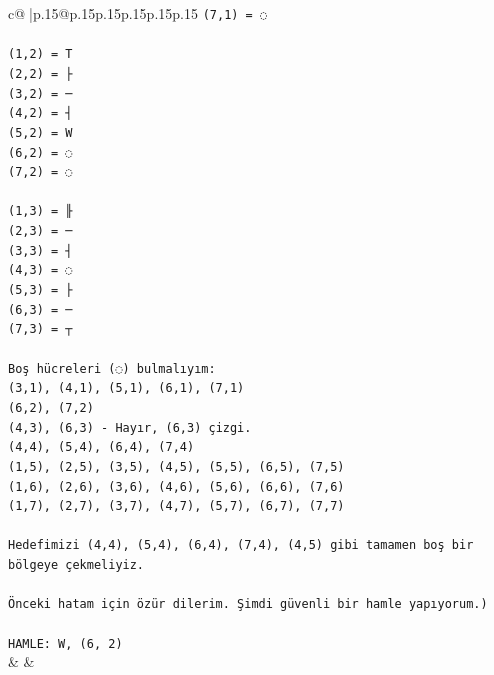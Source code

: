 \documentclass{article}
\begin{document}
{\begin{supertabular}{c@{$\;$}|p{.15\linewidth}@{}p{.15\linewidth}p{.15\linewidth}p{.15\linewidth}p{.15\linewidth}p{.15\linewidth}}
{{{\texttt{(7,1) = ◌} \\
\\ 
\texttt{(1,2) = T} \\
\texttt{(2,2) = ├} \\
\texttt{(3,2) = ─} \\
\texttt{(4,2) = ┤} \\
\texttt{(5,2) = W} \\
\texttt{(6,2) = ◌} \\
\texttt{(7,2) = ◌} \\
\\ 
\texttt{(1,3) = ╟} \\
\texttt{(2,3) = ─} \\
\texttt{(3,3) = ┤} \\
\texttt{(4,3) = ◌} \\
\texttt{(5,3) = ├} \\
\texttt{(6,3) = ─} \\
\texttt{(7,3) = ┬} \\
\\ 
\texttt{Boş hücreleri (◌) bulmalıyım:} \\
\texttt{(3,1), (4,1), (5,1), (6,1), (7,1)} \\
\texttt{(6,2), (7,2)} \\
\texttt{(4,3), (6,3) {-} Hayır, (6,3) çizgi.} \\
\texttt{(4,4), (5,4), (6,4), (7,4)} \\
\texttt{(1,5), (2,5), (3,5), (4,5), (5,5), (6,5), (7,5)} \\
\texttt{(1,6), (2,6), (3,6), (4,6), (5,6), (6,6), (7,6)} \\
\texttt{(1,7), (2,7), (3,7), (4,7), (5,7), (6,7), (7,7)} \\
\\ 
\texttt{Hedefimizi (4,4), (5,4), (6,4), (7,4), (4,5) gibi tamamen boş bir bölgeye çekmeliyiz.} \\
\\ 
\texttt{Önceki hatam için özür dilerim. Şimdi güvenli bir hamle yapıyorum.)} \\
\\ 
\texttt{HAMLE: W, (6, 2)} \\
            }
        }
    }
    & & \\ \\


\end{supertabular}}
\end{document}
